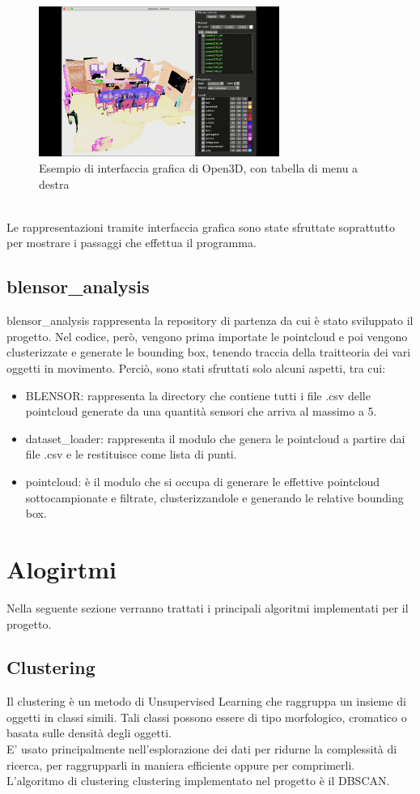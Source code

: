 \documentclass[italian]{report}
\begin{document}
\begin{figure}[H]
	\centering
	\includegraphics[width=0.7\textwidth]{o3dInterface}
	\footnotesize
	\caption{Esempio di interfaccia grafica di Open3D, con tabella di menu a destra}
\end{figure}\\
Le rappresentazioni tramite interfaccia grafica sono state sfruttate soprattutto per mostrare i passaggi che effettua il programma.

\section{blensor\_analysis}
blensor\_analysis rappresenta la repository di partenza da cui è stato sviluppato il progetto. Nel codice, però, vengono prima importate le pointcloud e poi vengono clusterizzate e generate le bounding box, tenendo traccia della traitteoria dei vari oggetti in movimento. Perciò, sono stati sfruttati solo alcuni aspetti, tra cui:
\begin{itemize}
	\item BLENSOR: rappresenta la directory che contiene tutti i file .csv delle pointcloud generate da una quantità sensori che arriva al massimo a 5.
	\item dataset\_loader: rappresenta il modulo che genera le pointcloud a partire dai file .csv e le restituisce come lista di punti.
	\item pointcloud: è il modulo che si occupa di generare le effettive pointcloud sottocampionate e filtrate, clusterizzandole e generando le relative bounding box.
\end{itemize}

\newpage
\chapter{Alogirtmi}
Nella seguente sezione verranno trattati i principali algoritmi implementati per il progetto.
\section{Clustering}
Il clustering è un metodo di Unsupervised Learning che raggruppa un insieme di oggetti in classi simili. Tali classi possono essere di tipo morfologico, cromatico o basata sulle densità degli oggetti.\\
E' usato principalmente nell'esplorazione dei dati per ridurne la complessità di ricerca, per raggrupparli in maniera efficiente oppure per comprimerli.\\
L'algoritmo di clustering clustering implementato nel progetto è il DBSCAN.
\end{document}
